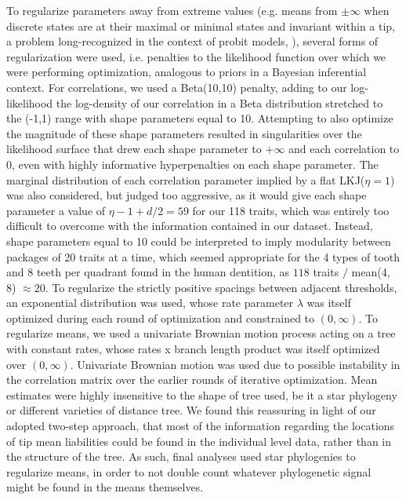 To regularize parameters away from extreme values (e.g. means from $\pm\infty$ when discrete states are at their maximal or minimal states and invariant within a tip, a problem long-recognized in the context of probit models, \citealt{fisherCaseZeroSurvivors1935}), several forms of regularization were used, i.e. penalties to the likelihood function over which we were performing optimization, analogous to priors in a Bayesian inferential context. For correlations, we used a Beta(10,10) penalty, adding to our log-likelihood the log-density of our correlation in a Beta distribution stretched to the (-1,1) range with shape parameters equal to 10. Attempting to also optimize the magnitude of these shape parameters resulted in singularities over the likelihood surface that drew each shape parameter to $+\infty$ and each correlation to 0, even with highly informative hyperpenalties on each shape parameter. The marginal distribution of each correlation parameter implied by a flat LKJ($\eta = 1$) was also considered, but judged too aggressive, as it would give each shape parameter a value of $\eta - 1 + d / 2 = 59$ for our 118 traits, which was entirely too difficult to overcome with the information contained in our dataset. Instead, shape parameters equal to 10 could be interpreted to imply modularity between packages of 20 traits at a time, which seemed appropriate for the 4 types of tooth and 8 teeth per quadrant found in the human dentition, as $118$ traits $/$ mean(4, 8) $\approx 20$. To regularize the strictly positive spacings between adjacent thresholds, an exponential distribution was used, whose rate parameter $\lambda$ was itself optimized during each round of optimization and constrained to $(0, \infty)$. To regularize means, we used a univariate Brownian motion process acting on a tree with constant rates, whose rates x branch length product was itself optimized over $(0, \infty)$. Univariate Brownian motion was used due to possible instability in the correlation matrix over the earlier rounds of iterative optimization. Mean estimates were highly insensitive to the shape of tree used, be it a star phylogeny or different varieties of distance tree. We found this reassuring in light of our adopted two-step approach, that most of the information regarding the locations of tip mean liabilities could be found in the individual level data, rather than in the structure of the tree. As such, final analyses used star phylogenies to regularize means, in order to not double count whatever phylogenetic signal might be found in the means themselves.

